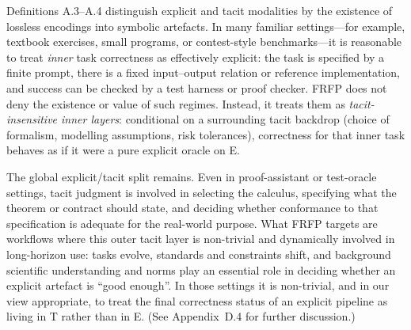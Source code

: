 Definitions A.3–A.4 distinguish explicit and tacit modalities by the existence of lossless encodings into symbolic artefacts.
In many familiar settings—for example, textbook exercises, small programs, or contest-style benchmarks—it is reasonable
to treat \emph{inner} task correctness as effectively explicit: the task is specified by a finite prompt, there is a fixed
input–output relation or reference implementation, and success can be checked by a test harness or proof checker.
FRFP does not deny the existence or value of such regimes. Instead, it treats them as \emph{tacit-insensitive inner layers}:
conditional on a surrounding tacit backdrop (choice of formalism, modelling assumptions, risk tolerances),
correctness for that inner task behaves as if it were a pure explicit oracle on E.

The global explicit/tacit split remains.
Even in proof-assistant or test-oracle settings, tacit judgment is involved in selecting the calculus, specifying what the
theorem or contract should state, and deciding whether conformance to that specification is adequate for the real-world
purpose.
What FRFP targets are workflows where this outer tacit layer is non-trivial and dynamically involved in long-horizon
use: tasks evolve, standards and constraints shift, and background scientific understanding and norms play an essential
role in deciding whether an explicit artefact is “good enough”.
In those settings it is non-trivial, and in our view appropriate, to treat the final correctness status of an explicit
pipeline as living in T rather than in E. (See Appendix~D.4 for further discussion.)


